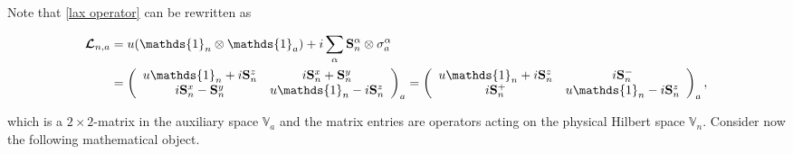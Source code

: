 \documentclass{homework}
\begin{document}
 Note that \cref{lax operator} can be rewritten as 

\begin{equation}
    \begin{split}
    \bm{\mathcal{L}}_{n, a} &= u(\mathds{1}_n \otimes \mathds{1}_a) + i \sum_{\alpha} \spin_n^\alpha \otimes \sigma_{a}^\alpha \\
    &= \left(\begin{array}{cc}
       u \mathds{1}_n + i \spin^{z}_{n} & i \spin^{x}_{n} + \spin^{y}_{n} \\
       i \spin^{x}_{n} - \spin^{y}_{n}  & u \mathds{1}_n - i \spin^{z}_{n}
    \end{array}\right)_a = \left(\begin{array}{cc}
       u \mathds{1}_n + i \spin^{z}_{n} & i \spin^{-}_{n} \\
       i \spin^{+}_{n} & u \mathds{1}_n - i \spin^{z}_{n}
    \end{array}\right)_a,
    \end{split}
\end{equation}
    
which is a $2 \times 2$-matrix in the auxiliary space $\mathds{V}_a$ and the matrix entries are operators acting on the physical Hilbert space $\mathds{V}_n$. Consider now the following mathematical object. 
\end{document}
